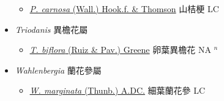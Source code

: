 \begin{itemize}
  \begin{itemize}
        \item[] \href{http://www.theplantlist.org/tpl1.1/search?q=Peracarpa+carnosa}{\textit{P. carnosa} (Wall.) Hook.f. \& Thomson}   山桔梗 LC
  \end{itemize}
 \item[] \textit{Triodanis} 異檐花屬
                    
  \begin{itemize}
        \item[] \href{http://www.theplantlist.org/tpl1.1/search?q=Triodanis+biflora}{\textit{T. biflora} (Ruiz \& Pav.) Greene}   卵葉異檐花 NA $^n$
  \end{itemize}
 \item[] \textit{Wahlenbergia} 蘭花參屬
                    
  \begin{itemize}
        \item[] \href{http://www.theplantlist.org/tpl1.1/search?q=Wahlenbergia+marginata}{\textit{W. marginata} (Thunb.) A.DC.}   細葉蘭花參 LC
  \end{itemize}
  \end{itemize}
